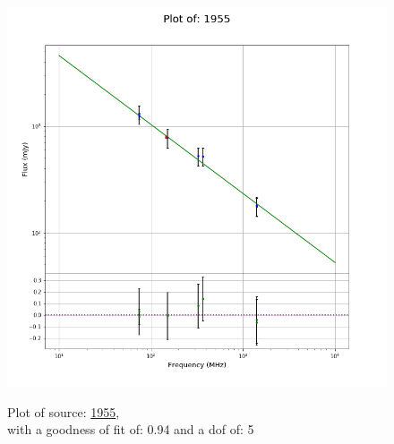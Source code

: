 \documentclass{article}
\begin{document}
\begin{figure}[H]
    \centering
    \begin{minipage}{.5\textwidth}
        \centering
        \includegraphics[scale = 0.35]{KmeulenTrap4P23_1hr/1hr1955.png}
        \captionsetup{labelformat=empty}
        \caption{Plot of source: \href{http://banana.transientskp.org/r4/vlo_KmeulenTrap4P23/runningcatalog/1955}{1955},\\with a goodness of fit of: 0.94 and a dof of: 5}
        \addtocounter{figure}{-1}
        \label{KmeulenTrap4P23:1hr:1955:plot}
    \end{minipage}%
    \begin{minipage}{0.5\textwidth}
        \centering


\end{minipage}
\end{figure}
\end{document}

